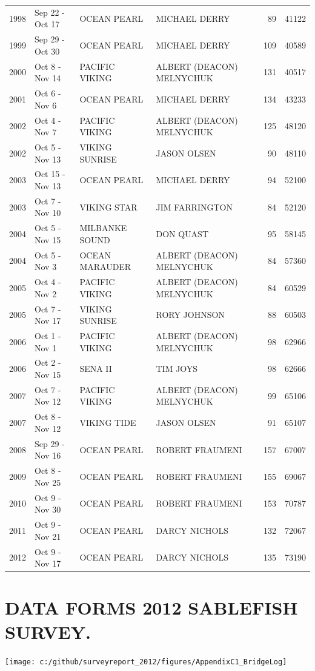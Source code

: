 \documentclass[12pt]{article}\usepackage[]{graphicx}\usepackage[]{color}
\begin{document}
\begin{appendices}
\begin{longtable}{rlllrr}
1998 & Sep 22  - Oct 17 & OCEAN PEARL & MICHAEL DERRY & 89 & 41122\\
1999 & Sep 29  - Oct 30 & OCEAN PEARL & MICHAEL DERRY & 109 & 40589\\
2000 & Oct  8  - Nov 14 & PACIFIC VIKING & ALBERT (DEACON) MELNYCHUK & 131 & 40517\\
2001 & Oct  6  - Nov  6 & OCEAN PEARL & MICHAEL DERRY & 134 & 43233\\
2002 & Oct  4  - Nov  7 & PACIFIC VIKING & ALBERT (DEACON) MELNYCHUK & 125 & 48120\\
2002 & Oct  5  - Nov 13 & VIKING SUNRISE & JASON OLSEN & 90 & 48110\\
2003 & Oct 15  - Nov 13 & OCEAN PEARL & MICHAEL DERRY & 94 & 52100\\
2003 & Oct  7  - Nov 10 & VIKING STAR & JIM FARRINGTON & 84 & 52120\\
2004 & Oct  5  - Nov 15 & MILBANKE SOUND & DON QUAST & 95 & 58145\\
2004 & Oct  5  - Nov  3 & OCEAN MARAUDER & ALBERT (DEACON) MELNYCHUK & 84 & 57360\\
2005 & Oct  4  - Nov  2 & PACIFIC VIKING & ALBERT (DEACON) MELNYCHUK & 84 & 60529\\
2005 & Oct  7  - Nov 17 & VIKING SUNRISE & RORY JOHNSON & 88 & 60503\\
2006 & Oct  1  - Nov  1 & PACIFIC VIKING & ALBERT (DEACON) MELNYCHUK & 98 & 62966\\
2006 & Oct  2  - Nov 15 & SENA II & TIM JOYS & 98 & 62666\\
2007 & Oct  7  - Nov 12 & PACIFIC VIKING & ALBERT (DEACON) MELNYCHUK & 99 & 65106\\
2007 & Oct  8  - Nov 12 & VIKING TIDE & JASON OLSEN & 91 & 65107\\
2008 & Sep 29  - Nov 16 & OCEAN PEARL & ROBERT FRAUMENI & 157 & 67007\\
2009 & Oct  8  - Nov 25 & OCEAN PEARL & ROBERT FRAUMENI & 155 & 69067\\
2010 & Oct  9  - Nov 30 & OCEAN PEARL & ROBERT FRAUMENI & 153 & 70787\\
2011 & Oct  9  - Nov 21 & OCEAN PEARL & DARCY NICHOLS & 132 & 72067\\
2012 & Oct  9  - Nov 17 & OCEAN PEARL & DARCY NICHOLS & 135 & 73190\\
\bottomrule
\end{longtable}
\endgroup{}

\clearpage

\section{DATA FORMS 2012 SABLEFISH SURVEY.}
\label{app:second-appendix}
\begin{center}\texttt{[image: c:/github/surveyreport\_2012/figures/AppendixC1\_BridgeLog]} \end{center}


\end{appendices}
\end{document}
